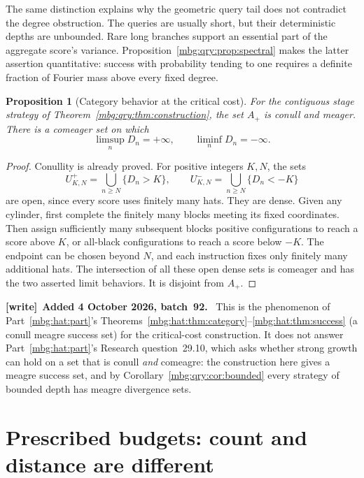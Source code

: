\documentclass[11pt,letterpaper]{article}
\newtheorem{proposition}[theorem]{Proposition}
\theoremstyle{definition}
\newenvironment{writenote}[1][]{\par\smallskip\begingroup\small
 \noindent\textbf{[write]}\if\relax\detokenize{#1}\relax\else~\textbf{#1.}\fi\ }%
 {\par\endgroup\smallskip}
\begin{document}
The same distinction explains why the geometric query tail does not
contradict the degree obstruction. The queries are usually short,
but their deterministic depths are unbounded. Rare long branches
support an essential part of the aggregate score's variance.
Proposition~\ref{mbg:qry:prop:spectral} makes the latter assertion quantitative:
success with probability tending to one requires a definite fraction
of Fourier mass above every fixed degree.

\begin{proposition}[Category behavior at the critical cost]
\label{mbg:qry:prop:categorypositive}
For the contiguous stage strategy of Theorem~\ref{mbg:qry:thm:construction},
the set \(A_+\) is conull and meager. There is a comeager set on which
\[
 \limsup_nD_n=+\infty,\qquad \liminf_nD_n=-\infty.
\]
\end{proposition}

\begin{proof}
Conullity is already proved. For positive integers \(K,N\), the sets
\[
 U^+_{K,N}=\bigcup_{n\ge N}\{D_n>K\},\qquad
 U^-_{K,N}=\bigcup_{n\ge N}\{D_n<-K\}
\]
are open, since every score uses finitely many hats. They are dense.
Given any cylinder, first complete the finitely many blocks meeting its
fixed coordinates. Then assign sufficiently many subsequent blocks
positive configurations to reach a score above \(K\), or all-black
configurations to reach a score below \(-K\). The endpoint can be
chosen beyond \(N\), and each instruction fixes only finitely many
additional hats.
The intersection of all these open dense sets is comeager and has the
two asserted limit behaviors. It is disjoint from \(A_+\).
\end{proof}

\begin{writenote}[Added 4 October 2026, batch~92]
This is the phenomenon of Part~\ref{mbg:hat:part}'s Theorems~\ref{mbg:hat:thm:category}--\ref{mbg:hat:thm:success} (a conull meagre success set) for the critical-cost construction. It does not answer Part~\ref{mbg:hat:part}'s Research question~29.10, which asks whether strong growth can hold on a set that is conull \emph{and} comeagre: the construction here gives a meagre success set, and by Corollary~\ref{mbg:qry:cor:bounded} every strategy of bounded depth has meagre divergence sets.
\end{writenote}

\section{Prescribed budgets: count and distance are different}
\label{mbg:qry:sec:budgets}
\end{document}

